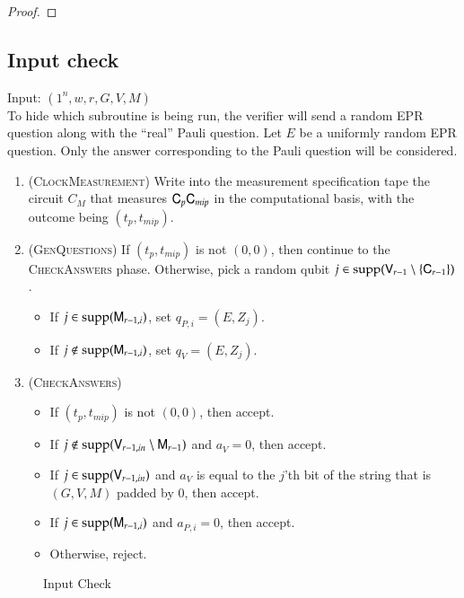 \begin{proof}
	
\end{proof}


\subsection{Input check}
\label{sec:input_check}


\vspace{10pt}
\begin{center}
\begin{mdframed}
    Input: $(1^n,w,r,G,V,M)$ \\
    To hide which subroutine is being run, the verifier will send a random EPR question along with the ``real'' Pauli question. Let $E$ be a uniformly random EPR question. Only the answer corresponding to the Pauli question will be considered.\\
	\begin{enumerate}
		\item (\textsc{ClockMeasurement}) Write into the measurement specification tape the circuit $C_M$ that measures ${\mathsf{C}}_p {\mathsf{C}}_{mip}$ in the computational basis, with the outcome being $(t_p,t_{mip})$.
		\item (\textsc{GenQuestions}) If $(t_p,t_{mip})$ is not $(0,0)$, then continue to the \textsc{CheckAnswers} phase. Otherwise, pick a random qubit $j \in \operatorname{supp}({\mathsf{V}}_{r-1} \setminus \{{\mathsf{C}}_{r-1} \})$. 
		\begin{itemize}
			\item If $j \in \operatorname{supp}({\mathsf{M}}_{r-1,i})$, set $q_{P,i} = (E,Z_j)$.
			\item If $j \notin \operatorname{supp}({\mathsf{M}}_{r-1,i})$, set $q_V = (E,Z_j)$.
		\end{itemize}
		
		\item (\textsc{CheckAnswers}) 
		\begin{itemize}
			\item If $(t_p,t_{mip})$ is not $(0,0)$, then accept. 
			\item If $j \notin \operatorname{supp}({\mathsf{V}}_{r-1,in} \setminus {\mathsf{M}}_{r-1})$ and $a_V = 0$, then accept. 
			\item If $j \in \operatorname{supp}({\mathsf{V}}_{r-1,in})$ and $a_V$ is equal to the $j$'th bit of the string that is $(G,V,M)$ padded by $0$, then accept. 
			\item If $j \in \operatorname{supp}({\mathsf{M}}_{r-1,i})$ and $a_{P,i} = 0$, then accept.
			\item Otherwise, reject.
		\end{itemize}
	\end{enumerate}    
\end{mdframed}
\end{center}
\begin{figure}[H]
\caption{Input Check}
\label{fig:input_check}
\end{figure}

